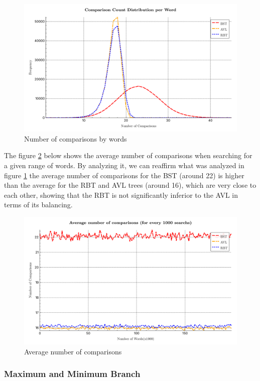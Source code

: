  \begin{figure}[H]
     \centering
     \includegraphics[width=0.8\linewidth]{img/Graph_6_199865.pdf}
     \caption{Number of comparisons by words}
     \label{fig:comparacoes2}
 \end{figure}

 The figure \ref{fig:averagecomp2} below shows the average number of comparisons when searching for a given range of words. 
By analyzing it, we can reaffirm what was analyzed in figure \ref{fig:comparacoes2} the average number of comparisons for the BST (around 22) 
is higher than the average for the RBT and AVL trees (around 16), which are very close to each other, showing that the 
RBT is not significantly inferior to the AVL in terms of its balancing.

 \begin{figure}[H]
     \centering
     \includegraphics[width=0.8\linewidth]{img/Graph_7_199865.pdf}
     \caption{Average number of comparisons}
     \label{fig:averagecomp2}
 \end{figure}

 \subsubsection{Maximum and Minimum Branch}

